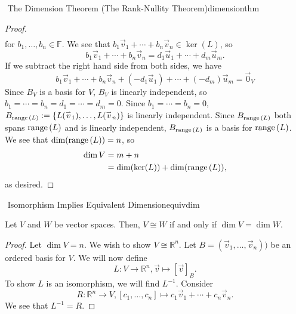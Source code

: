 \begin{theorem}{\Stop\,\,The Dimension Theorem (The Rank-Nullity Theorem)}{dimensionthm}
\begin{proof}
\begin{align*}
                \end{align*}
                for \(b_1,\ldots,b_n\in\mathbb{F}\). We see that \(b_1\vec{v}_1+\cdots+b_n\vec{v}_n\in\ker(L)\), so
                \begin{equation*}
                    b_1\vec{v}_1+\cdots+b_n\vec{v}_n=d_1\vec{u}_1+\cdots+d_m\vec{u}_m.
                \end{equation*}
                If we subtract the right hand side from both sides, we have
                \begin{equation*}
                    b_1\vec{v}_1+\cdots+b_n\vec{v}_n+(-d_1\vec{u}_1)+\cdots+(-d_m)\vec{u}_m=\vec{0}_V
                \end{equation*}
                Since \(B_V\) is a basis for \(V\), \(B_V\) is linearly independent, so \(b_1=\cdots=b_n=d_1=\cdots=d_m=0\). Since \(b_1=\cdots=b_n=0\), \(B_{\text{range\,}(L)}:=\{L(\overset{_{\rightharpoonup}}{v}_1),\ldots,L(\overset{_{\rightharpoonup}}{v}_n)\}\) is linearly independent. Since \(B_{\text{range\,}(L)}\) both spans \(\text{range\,}(L)\) and is linearly independent, \(B_{\text{range\,}(L)}\) is a basis for \(\text{range\,}(L)\). We see that \(\dim(\text{range\,}(L))=n\), so
                \begin{align*}
                    \dim V&=m+n \\
                    &=\dim(\ker(L))+\dim(\text{range\,}(L)),
                \end{align*}
                as desired.

            \end{proof}

        \end{theorem}
        \begin{theorem}{\Stop\,\,Isomorphism Implies Equivalent Dimension}{equivdim}

            Let \(V\) and \(W\) be vector spaces. Then, \(V\cong W\) if and only if \(\dim V=\dim W\).
            \begin{proof}
                Let \(\dim V=n\). We wish to show \(V\cong\mathbb{R}^n\). Let \(B=(\vec{v}_1,\ldots,\vec{v}_n))\) be an ordered basis for \(V\). We will now define
                \begin{equation*}
                    L:V\to\mathbb{R}^n,\vec{v}\mapsto[\vec{v}]_B.
                \end{equation*}
                To show \(L\) is an isomorphism, we will find \(L^{-1}\). Consider 
                \begin{equation*}
                    R:\mathbb{R}^n\to V,[c_1,\ldots,c_n]\mapsto c_1\vec{v}_1+\cdots+c_n\vec{v}_n.
                \end{equation*}
                We see that \(L^{-1}=R\).
            \end{proof}
            
        \end{theorem}

